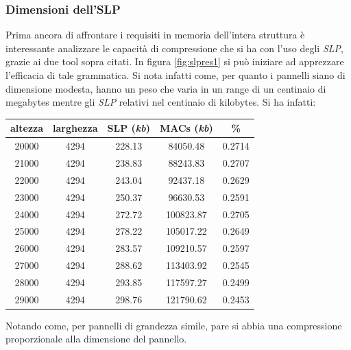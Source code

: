 \subsubsection{Dimensioni dell'SLP}
Prima ancora di affrontare i requisiti
in memoria dell'intera struttura è interessante analizzare le capacità di
compressione che si ha con l'uso degli \textit{SLP}, grazie ai due tool sopra
citati. In figura \ref{fig:slpres1} si può iniziare ad apprezzare l'efficacia di
tale grammatica. Si nota infatti come, per quanto i pannelli siano di dimensione
modesta, hanno un peso che varia in un range di un centinaio di megabytes mentre
gli \textit{SLP} relativi nel centinaio di kilobytes. Si ha infatti:
\begin{table}[H]
  \centering
  \begin{tabular}{c|c|c|c|c}
    \textbf{altezza} & \textbf{larghezza} & \textbf{SLP (\textit{kb})}
    & \textbf{MACs (\textit{kb})} & \textbf{\%}\\
    \hline
    20000 & 4294 & 228.13 & 84050.48 & 0.2714\\
    21000 & 4294 & 238.83 & 88243.83 & 0.2707\\
    22000 & 4294 & 243.04 & 92437.18 & 0.2629\\
    23000 & 4294 & 250.37 & 96630.53 & 0.2591\\
    24000 & 4294 & 272.72 & 100823.87 & 0.2705\\
    25000 & 4294 & 278.22 & 105017.22 & 0.2649\\
    26000 & 4294 & 283.57 & 109210.57 & 0.2597\\
    27000 & 4294 & 288.62 & 113403.92 & 0.2545\\
    28000 & 4294 & 293.85 & 117597.27 & 0.2499\\
    29000 & 4294 & 298.76 & 121790.62 & 0.2453\\
  \end{tabular}
\end{table}
Notando come, per pannelli di grandezza simile, pare si abbia una compressione
proporzionale alla dimensione del pannello.\\
